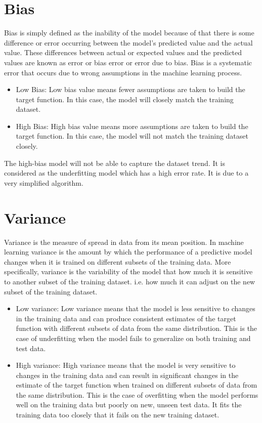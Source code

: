 \section{Bias}
    Bias is simply defined as the inability of the model because of that there is some difference or error occurring between the model’s predicted value and the actual value. These differences between actual or expected values and the predicted values are known as error or bias error or error due to bias. Bias is a systematic error that occurs due to wrong assumptions in the machine learning process. 

    \begin{itemize}
        \item Low Bias: Low bias value means fewer assumptions are taken to build the target function. In this case, the model will closely match the training dataset.
        \item High Bias: High bias value means more assumptions are taken to build the target function. In this case, the model will not match the training dataset closely. 
    \end{itemize}

    The high-bias model will not be able to capture the dataset trend. It is considered as the underfitting model which has a high error rate. It is due to a very simplified algorithm.

\section{Variance}
    Variance is the measure of spread in data from its mean position. In machine learning variance is the amount by which the performance of a predictive model changes when it is trained on different subsets of the training data. More specifically, variance is the variability of the model that how much it is sensitive to another subset of the training dataset. i.e. how much it can adjust on the new subset of the training dataset.

    \begin{itemize}
        \item Low variance: Low variance means that the model is less sensitive to changes in the training data and can produce consistent estimates of the target function with different subsets of data from the same distribution. This is the case of underfitting when the model fails to generalize on both training and test data.
        \item High variance: High variance means that the model is very sensitive to changes in the training data and can result in significant changes in the estimate of the target function when trained on different subsets of data from the same distribution. This is the case of overfitting when the model performs well on the training data but poorly on new, unseen test data. It fits the training data too closely that it fails on the new training dataset.
    \end{itemize}

